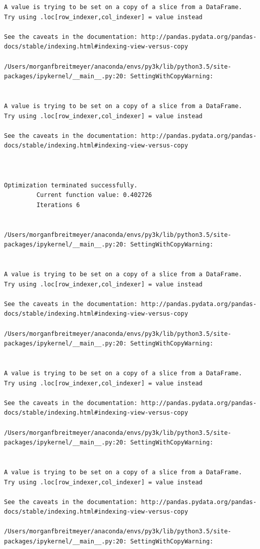 \begin{lstlisting}
A value is trying to be set on a copy of a slice from a DataFrame.
Try using .loc[row_indexer,col_indexer] = value instead

See the caveats in the documentation: http://pandas.pydata.org/pandas-docs/stable/indexing.html#indexing-view-versus-copy

/Users/morganfbreitmeyer/anaconda/envs/py3k/lib/python3.5/site-packages/ipykernel/__main__.py:20: SettingWithCopyWarning:


A value is trying to be set on a copy of a slice from a DataFrame.
Try using .loc[row_indexer,col_indexer] = value instead

See the caveats in the documentation: http://pandas.pydata.org/pandas-docs/stable/indexing.html#indexing-view-versus-copy



Optimization terminated successfully.
         Current function value: 0.402726
         Iterations 6


/Users/morganfbreitmeyer/anaconda/envs/py3k/lib/python3.5/site-packages/ipykernel/__main__.py:20: SettingWithCopyWarning:


A value is trying to be set on a copy of a slice from a DataFrame.
Try using .loc[row_indexer,col_indexer] = value instead

See the caveats in the documentation: http://pandas.pydata.org/pandas-docs/stable/indexing.html#indexing-view-versus-copy

/Users/morganfbreitmeyer/anaconda/envs/py3k/lib/python3.5/site-packages/ipykernel/__main__.py:20: SettingWithCopyWarning:


A value is trying to be set on a copy of a slice from a DataFrame.
Try using .loc[row_indexer,col_indexer] = value instead

See the caveats in the documentation: http://pandas.pydata.org/pandas-docs/stable/indexing.html#indexing-view-versus-copy

/Users/morganfbreitmeyer/anaconda/envs/py3k/lib/python3.5/site-packages/ipykernel/__main__.py:20: SettingWithCopyWarning:


A value is trying to be set on a copy of a slice from a DataFrame.
Try using .loc[row_indexer,col_indexer] = value instead

See the caveats in the documentation: http://pandas.pydata.org/pandas-docs/stable/indexing.html#indexing-view-versus-copy

/Users/morganfbreitmeyer/anaconda/envs/py3k/lib/python3.5/site-packages/ipykernel/__main__.py:20: SettingWithCopyWarning:



\end{lstlisting}

